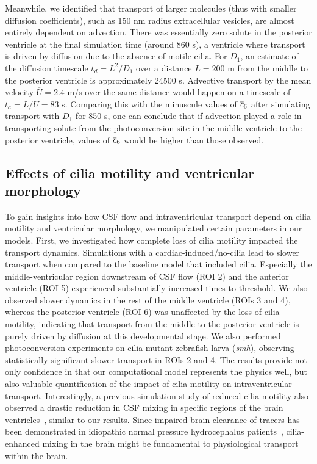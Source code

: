 \documentclass{WileyMSP-template}
\begin{document}
Meanwhile, we identified that transport of larger molecules
(thus with smaller diffusion coefficients),
such as 150 nm radius extracellular vesicles, are almost entirely dependent on advection.
There was essentially zero solute in the posterior ventricle at the
final simulation time (around 860 s), a ventricle where transport is driven
by diffusion due to the absence of motile cilia.
For $D_1$, an estimate of the diffusion timescale $t_d=L^2/D_1$ over a distance
$L=200$ \textmu m from the middle to the posterior ventricle is approximately 24500 s.
Advective transport by the mean velocity $\overline{U}=2.4$ \textmu m/s over the same
distance would happen on a timescale of $t_a=L/\overline{U}=83$ s.
Comparing this with the minuscule values of $\overline{c}_6$ after simulating transport
with $D_1$ for 850 s, one can conclude that if advection
played a role in transporting solute from the photoconversion site in the middle ventricle
to the posterior ventricle, values of $\overline{c}_6$ would be higher than those observed.

\subsection{Effects of cilia motility and ventricular morphology}
To gain insights into how CSF flow and intraventricular transport depend on cilia
motility and ventricular morphology, we manipulated certain
parameters in our models. First, we investigated how complete loss of cilia motility
impacted the transport dynamics. Simulations with a cardiac-induced/no-cilia lead to
slower transport when compared to the baseline model that included cilia. Especially
the middle-ventricular region downstream of CSF flow (ROI 2) and the anterior ventricle (ROI 5)
experienced substantially increased times-to-threshold. We also observed
slower dynamics in the rest of the middle ventricle (ROIs 3 and 4), whereas the
posterior ventricle (ROI 6) was unaffected by the loss
of cilia motility, indicating that transport from the middle to the posterior ventricle is
purely driven by diffusion at this developmental stage.
We also performed photoconversion experiments on cilia mutant
zebrafish larva (\emph{smh}), observing statistically significant slower transport in 
ROIs 2 and 4. The results provide not only confidence in that our computational model
represents the physics well, but also valuable quantification of the impact of cilia motility
on intraventricular transport. Interestingly, a previous simulation study of reduced cilia motility
also observed a drastic reduction in CSF mixing in specific regions of the brain
ventricles~\cite{Yoshida2022EffectVentricles}, similar to our results. Since impaired brain 
clearance of tracers has been demonstrated in idiopathic normal pressure hydrocephalus
patients~\cite{Eide2020MagneticHydrocephalus}, cilia-enhanced mixing in the brain might be
fundamental to physiological transport within the brain.
\end{document}
